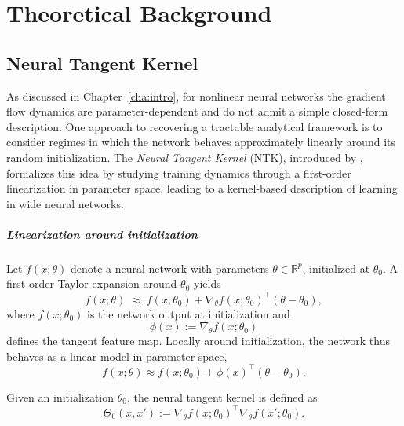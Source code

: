 \chapter{Theoretical Background}\label{cha:background}

\section{Neural Tangent Kernel}\label{sec:ntk}

As discussed in Chapter~\ref{cha:intro}, for nonlinear neural networks the
gradient flow dynamics are parameter-dependent and do not admit a simple
closed-form description. One approach to recovering a tractable analytical
framework is to consider regimes in which the network behaves approximately
linearly around its random initialization. The \emph{Neural Tangent Kernel}
(NTK), introduced by \citet{jacot2018ntk}, formalizes this idea by studying
training dynamics through a first-order linearization in parameter space,
leading to a kernel-based description of learning in wide neural networks.

\paragraph{Linearization around initialization}

Let $f(x;\theta)$ denote a neural network with parameters
$\theta \in \mathbb{R}^p$, initialized at $\theta_0$. A first-order Taylor
expansion around $\theta_0$ yields
\begin{equation}
	f(x;\theta)
	\;\approx\;
	f(x;\theta_0)
	+
	\nabla_\theta f(x;\theta_0)^\top (\theta - \theta_0),
	\label{eq:ntk-linearization}
\end{equation}
where $f(x;\theta_0)$ is the network output at initialization and
\[
	\phi(x) := \nabla_\theta f(x;\theta_0)
\]
defines the tangent feature map. Locally around initialization, the network
thus behaves as a linear model in parameter space,
\begin{equation}
	f(x;\theta) \approx f(x;\theta_0) + \phi(x)^\top (\theta - \theta_0).
	\label{eq:ntk-linear-model}
\end{equation}

\begin{definition}
	Given an initialization $\theta_0$, the neural tangent kernel is defined as
	\[
		\Theta_0(x,x')
		:= \nabla_\theta f(x;\theta_0)^\top
		\nabla_\theta f(x';\theta_0).
	\]
\end{definition}

